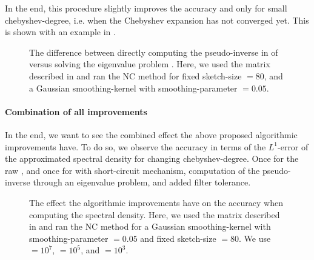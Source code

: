 In the end, this procedure slightly improves the accuracy
and only for small \gls{chebyshev-degree}, i.e. when the Chebyshev expansion has
not converged yet. This is shown with an example in .\\

\begin{figure}[ht]
    \centering
    
    \caption{The difference between directly computing the pseudo-inverse
        in  of 
        versus solving the eigenvalue problem .
        Here, we used the matrix described in 
        and ran the \gls{NC} method for fixed \gls{sketch-size} $=80$, and a
        Gaussian \gls{smoothing-kernel} with \gls{smoothing-parameter} $=0.05$.}
    \label{fig:3-nystrom-eigenvalue-problem}
\end{figure}

\paragraph{Combination of all improvements}

In the end, we want to see the combined effect the above proposed algorithmic
improvements have. To do so, we observe the accuracy in terms of the $L^1$-error
of the approximated spectral density for changing \gls{chebyshev-degree}. Once
for the raw , and once for 
with short-circuit mechanism, computation of the pseudo-inverse through
an eigenvalue problem, and added filter tolerance.

\begin{figure}[ht]
    \centering
    
    \caption{The effect the algorithmic improvements have on the accuracy when
        computing the spectral density.
        Here, we used the matrix described in 
        and ran the \gls{NC} method for a Gaussian \gls{smoothing-kernel} with \gls{smoothing-parameter} $=0.05$
        and fixed \gls{sketch-size} $=80$. We use
         $=10^7$,
         $=10^5$, and
         $=10^3$.}
    \label{fig:3-nystrom-improved-algorithm}
\end{figure}

